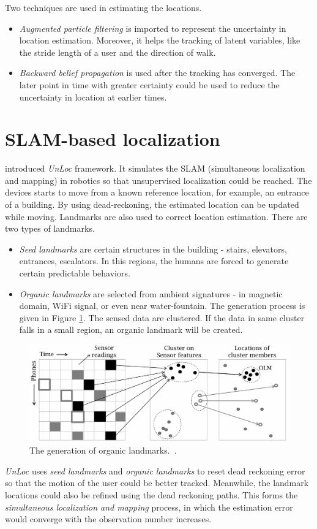 \documentclass[letterpaper]{article}
\begin{document}
Two techniques are used in estimating the locations.
\begin{itemize}
\item \emph{Augmented particle filtering} is imported to represent the uncertainty in location estimation.
Moreover, it helps the tracking of latent variables, like the stride length of a user and the direction of walk.
\item \emph{Backward belief propagation} is used after the tracking has converged.
The later point in time with greater certainty could be used to reduce the uncertainty in location at earlier times.
\end{itemize}


\section{SLAM-based localization}

\cite{Wang:2012:NNW:2307636.2307655} introduced \emph{UnLoc} framework.
It simulates the SLAM (simultaneous localization and mapping) in robotics so that unsupervised localization could be reached.
The devices starts to move from a known reference location, for example, an entrance of a building.
By using dead-reckoning, the estimated location can be updated while moving.
Landmarks are also used to correct location estimation.
There are two types of landmarks.
\begin{itemize}
	\item \emph{Seed landmarks} are certain structures in the building - stairs, elevators, entrances, escalators.
	In this regions, the humans are forced to generate certain predictable behaviors.
	\item \emph{Organic landmarks} are selected from ambient signatures - in magnetic domain, WiFi signal, or even near water-fountain.
	The generation process is given in Figure \ref{fig:olm}.
	The sensed data are clustered.
	If the data in same cluster falls in a small region, an organic landmark will be created.
\end{itemize}
\begin{figure}
	\centering
	\includegraphics[width=0.9\linewidth]{fig/OLM.png}
	\caption{The generation of organic landmarks.~\cite{Wang:2012:NNW:2307636.2307655}.}
	\label{fig:olm}
\end{figure}
\emph{UnLoc} uses \emph{seed landmarks} and \emph{organic landmarks} to reset dead reckoning error so that the motion of the user could be better tracked.
Meanwhile, the landmark locations could also be refined using the dead reckoning paths. 
This forms the \emph{simultaneous localization and mapping} process, in which the estimation error would converge with the observation number increases.
\end{document}
